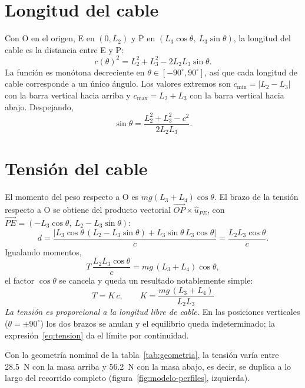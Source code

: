 \section{Longitud del cable}

Con O en el origen, E en $(0, L_2)$ y P en $(L_3\cos\theta,\ L_3\sin\theta)$, la longitud del cable
es la distancia entre E y P:
\begin{equation}
  c(\theta)^2 = L_2^2 + L_3^2 - 2L_2L_3\sin\theta .
  \label{eq:cable}
\end{equation}
La función es monótona decreciente en $\theta\in[-90^\circ,90^\circ]$, así que cada longitud de
cable corresponde a un único ángulo. Los valores extremos son
$c_{\min} = |L_2-L_3|$ con la barra vertical hacia arriba y $c_{\max} = L_2+L_3$ con la barra
vertical hacia abajo. Despejando,
\begin{equation}
  \sin\theta = \frac{L_2^2 + L_3^2 - c^2}{2L_2L_3}.
  \label{eq:angulo}
\end{equation}

\section{Tensión del cable}

El momento del peso respecto a O es $mg(L_3+L_4)\cos\theta$. El brazo de la tensión respecto a O
se obtiene del producto vectorial $\overrightarrow{OP}\times\hat{u}_{PE}$, con
$\overrightarrow{PE}=(-L_3\cos\theta,\ L_2 - L_3\sin\theta)$:
\begin{equation}
  d = \frac{\left| L_3\cos\theta\,(L_2 - L_3\sin\theta) + L_3\sin\theta\, L_3\cos\theta \right|}{c}
    = \frac{L_2 L_3 \cos\theta}{c}.
\end{equation}
Igualando momentos,
\begin{equation}
  T\,\frac{L_2L_3\cos\theta}{c} = mg\,(L_3+L_4)\cos\theta ,
  \label{eq:equilibrio}
\end{equation}
el factor $\cos\theta$ se cancela y queda un resultado notablemente simple:
\begin{equation}
  \boxed{\,T = K\,c, \qquad K = \frac{mg\,(L_3+L_4)}{L_2L_3}\,}
  \label{eq:tension}
\end{equation}
\emph{La tensión es proporcional a la longitud libre de cable.} En las posiciones verticales
($\theta=\pm 90^\circ$) los dos brazos se anulan y el equilibrio queda indeterminado; la
expresión~\eqref{eq:tension} da el límite por continuidad.

Con la geometría nominal de la tabla~\ref{tab:geometria}, la tensión varía entre
\SI{28.5}{\newton} con la masa arriba y \SI{56.2}{\newton} con la masa abajo, es decir, se
duplica a lo largo del recorrido completo (figura~\ref{fig:modelo-perfiles}, izquierda).

